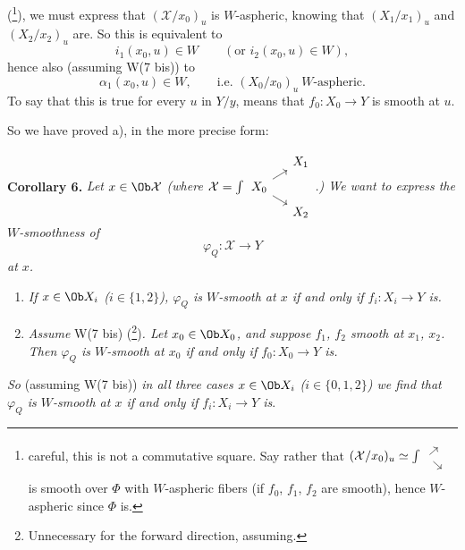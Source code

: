 (\footnote[107]{careful, this is not a commutative square. Say rather that $(\mathcal{X}/x_0)_u \simeq \int \begin{tikzcd}[ampersand replacement=\&, row sep=0.4em, column sep=0.4em, baseline=(\tikzcdmatrixname-2-1.base)] \& {} \\ {} \ar[ur]\ar[dr] \& \\ \& {} \end{tikzcd}$ is smooth over $\Phi$ with $W$-aspheric fibers (if $f_0$, $f_1$, $f_2$ are smooth), hence $W$-aspheric since $\Phi$ is.}), we must express that $(\mathcal{X}/x_0)_u$ is $W$-aspheric, knowing that $(X_1/x_1)_u$ and $(X_2/x_2)_u$ are. So this is equivalent to %
\[
i_1(x_0,u) \in W \qquad (\text{or } i_2(x_0,u) \in W),
\]
hence also (assuming W(7 bis)) to
\[
\alpha_1(x_0,u) \in W, \qquad \text{i.e. } (X_0/x_0)_u \ W\text{-aspheric.}
\]
To say that this is true for every $u$ in $Y/y$, means that $f_0 : X_0 \longrightarrow Y$ is smooth at $u$.

So we have proved a), in the more precise form:

\textbf{Corollary 6.} \textit{Let $x \in \Ob \mathcal{X}$ (where $\mathcal{X} = \int \begin{tikzcd}[ampersand replacement=\&, row sep=tiny, column sep=small, baseline=(\tikzcdmatrixname-2-1.base)] \& X_1 \\ X_0 \ar[ur]\ar[dr] \& \\ \& X_2 \end{tikzcd}$.) We want to express the $W$-smoothness of}
\[
\varphi_Q : \mathcal{X} \longrightarrow Y
\]
\textit{at $x$.}

\begin{enumerate}[label={}, leftmargin=2.5em]
\item[\textit{a)}] \textit{If $x \in \Ob X_i$ ($i \in \{1,2\}$), $\varphi_Q$ is $W$-smooth at $x$ if and only if $f_i : X_i \longrightarrow Y$ is.}
\item[\textit{b)}] \textit{Assume} \textup{W(7 bis)} (\footnote[108]{Unnecessary for the forward direction, assuming.})\textit{. Let $x_0 \in \Ob X_0$, and suppose $f_1$, $f_2$ smooth at $x_1$, $x_2$. Then $\varphi_Q$ is $W$-smooth at $x_0$ if and only if $f_0 : X_0 \longrightarrow Y$ is.}
\end{enumerate}

\textit{So} (assuming W(7 bis)) \textit{in all three cases $x \in \Ob X_i$ ($i \in \{0,1,2\}$) we find that $\varphi_Q$ is $W$-smooth at $x$ if and only if $f_i : X_i \longrightarrow Y$ is}.

